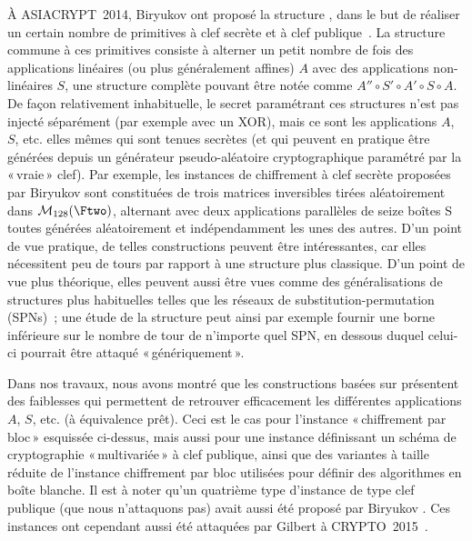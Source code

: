 À ASIACRYPT~2014, Biryukov \etal ont proposé la structure \asasa, dans le but de réaliser un certain nombre de primitives à clef secrète et à clef publique~\cite{DBLP:conf/asiacrypt/BiryukovBK14}.
La structure commune à ces primitives consiste à alterner un petit nombre de fois des applications linéaires (ou plus généralement affines) $A$ avec des applications non-linéaires $S$, une structure
complète pouvant être notée
comme $A'' \circ S' \circ A' \circ S \circ A$. De façon relativement inhabituelle, le secret paramétrant ces structures n'est pas injecté séparément (par exemple avec un XOR), mais ce sont
les applications $A$, $S$, etc. elles mêmes qui sont tenues secrètes (et qui peuvent en pratique être générées depuis un générateur pseudo-aléatoire cryptographique paramétré par la «\,vraie\,»
clef). Par exemple, les instances \asasa de chiffrement à clef secrète proposées par Biryukov \etal sont constituées de
trois matrices inversibles tirées aléatoirement dans $\mathcal{M}_{128}(\Ftwo)$,
alternant avec deux applications parallèles de seize boîtes S toutes générées aléatoirement et indépendamment les unes des autres.
D'un point de vue pratique, de telles constructions peuvent être intéressantes, car elles nécessitent peu de tours par rapport à une structure plus classique. D'un point de vue plus théorique, elles peuvent
aussi être vues comme des généralisations de structures plus habituelles telles que les réseaux de substitution-permutation (SPNs)~; une étude de la structure \asasa peut ainsi par exemple fournir une borne inférieure sur le nombre de tour
de n'importe quel SPN, en dessous duquel celui-ci pourrait être attaqué «\,génériquement\,».

Dans nos travaux, nous avons montré que les constructions basées sur \asasa présentent des faiblesses qui permettent de retrouver efficacement les différentes applications $A$, $S$, etc.
(à équivalence prêt). Ceci est le cas pour l'instance «\,chiffrement par bloc\,» esquissée ci-dessus, mais aussi pour une instance définissant un schéma de cryptographie «\,multivariée\,»
à clef publique, ainsi que des variantes à taille réduite de l'instance chiffrement par bloc utilisées pour définir des algorithmes en boîte blanche.
Il est à noter qu'un quatrième type d'instance de type clef publique (que nous n'attaquons pas) avait aussi été proposé par Biryukov \etal. Ces instances ont cependant aussi été attaquées par
Gilbert \etal à CRYPTO~2015~\cite{DBLP:conf/crypto/GilbertPT15}.
 
